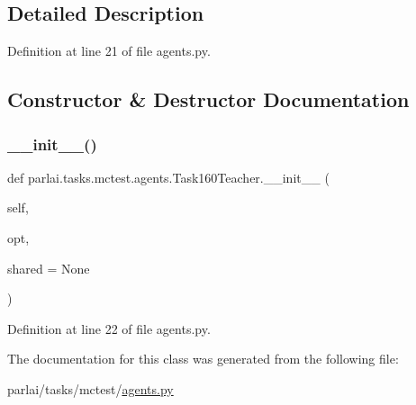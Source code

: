 \subsection{Detailed Description}


Definition at line 21 of file agents.\+py.



\subsection{Constructor \& Destructor Documentation}
\mbox{\label{classparlai_1_1tasks_1_1mctest_1_1agents_1_1Task160Teacher_ada45ef335bc03d8fa3a410b4e9b6b282}} 
\subsubsection{\texorpdfstring{\+\_\+\+\_\+init\+\_\+\+\_\+()}{\_\_init\_\_()}}
{\footnotesize\ttfamily def parlai.\+tasks.\+mctest.\+agents.\+Task160\+Teacher.\+\_\+\+\_\+init\+\_\+\+\_\+ (\begin{DoxyParamCaption}\item[{}]{self,  }\item[{}]{opt,  }\item[{}]{shared = {\ttfamily None} }\end{DoxyParamCaption})}



Definition at line 22 of file agents.\+py.



The documentation for this class was generated from the following file\+:\begin{DoxyCompactItemize}
\item 
parlai/tasks/mctest/\hyperlink{parlai_2tasks_2mctest_2agents_8py}{agents.\+py}\end{DoxyCompactItemize}
